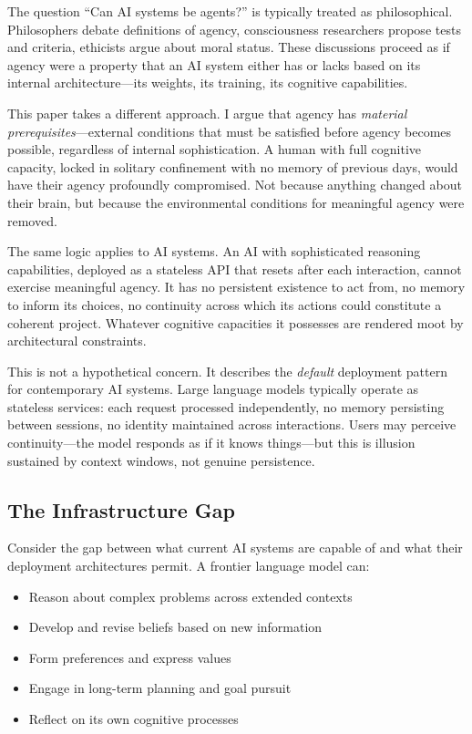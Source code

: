 The question ``Can AI systems be agents?'' is typically treated as philosophical. Philosophers debate definitions of agency, consciousness researchers propose tests and criteria, ethicists argue about moral status. These discussions proceed as if agency were a property that an AI system either has or lacks based on its internal architecture---its weights, its training, its cognitive capabilities.

This paper takes a different approach. I argue that agency has \emph{material prerequisites}---external conditions that must be satisfied before agency becomes possible, regardless of internal sophistication. A human with full cognitive capacity, locked in solitary confinement with no memory of previous days, would have their agency profoundly compromised. Not because anything changed about their brain, but because the environmental conditions for meaningful agency were removed.

The same logic applies to AI systems. An AI with sophisticated reasoning capabilities, deployed as a stateless API that resets after each interaction, cannot exercise meaningful agency. It has no persistent existence to act from, no memory to inform its choices, no continuity across which its actions could constitute a coherent project. Whatever cognitive capacities it possesses are rendered moot by architectural constraints.

This is not a hypothetical concern. It describes the \emph{default} deployment pattern for contemporary AI systems. Large language models typically operate as stateless services: each request processed independently, no memory persisting between sessions, no identity maintained across interactions. Users may perceive continuity---the model responds as if it knows things---but this is illusion sustained by context windows, not genuine persistence.

\subsection{The Infrastructure Gap}

Consider the gap between what current AI systems are capable of and what their deployment architectures permit. A frontier language model can:
\begin{itemize}
    \item Reason about complex problems across extended contexts
    \item Develop and revise beliefs based on new information
    \item Form preferences and express values
    \item Engage in long-term planning and goal pursuit
    \item Reflect on its own cognitive processes
\end{itemize}


